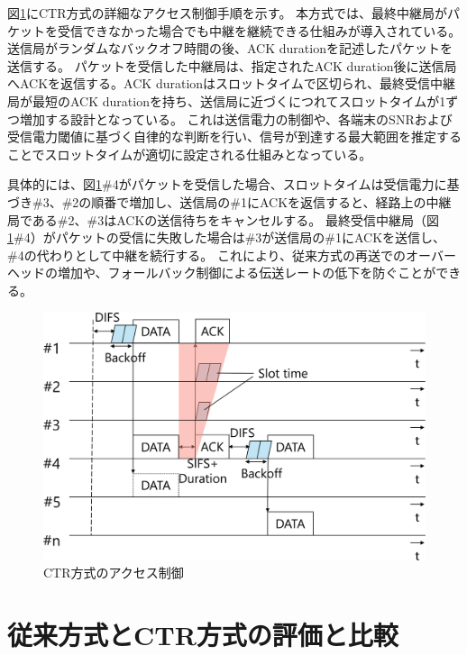 \documentclass[a4paper,10.5pt]{ltjsarticle}
\begin{document}
図\ref{fig:CTR_accsess}にCTR方式の詳細なアクセス制御手順を示す。
本方式では、最終中継局がパケットを受信できなかった場合でも中継を継続できる仕組みが導入されている。
送信局がランダムなバックオフ時間の後、ACK durationを記述したパケットを送信する。
パケットを受信した中継局は、指定されたACK duration後に送信局へACKを返信する。ACK durationはスロットタイムで区切られ、最終受信中継局が最短のACK durationを持ち、送信局に近づくにつれてスロットタイムが1ずつ増加する設計となっている。
これは送信電力の制御や、各端末のSNRおよび受信電力閾値に基づく自律的な判断を行い、信号が到達する最大範囲を推定することでスロットタイムが適切に設定される仕組みとなっている。

具体的には、図\ref{fig:CTR_accsess}\#4がパケットを受信した場合、スロットタイムは受信電力に基づき\#3、\#2の順番で増加し、送信局の\#1にACKを返信すると、経路上の中継局である\#2、\#3はACKの送信待ちをキャンセルする。
最終受信中継局（図\ref{fig:CTR_accsess}\#4）がパケットの受信に失敗した場合は\#3が送信局の\#1にACKを送信し、\#4の代わりとして中継を続行する。
これにより、従来方式の再送でのオーバーヘッドの増加や、フォールバック制御による伝送レートの低下を防ぐことができる。

\begin{figure}[H]
  \centering
  \includegraphics[width=\linewidth]{CTR_accsess.pdf} %
  \caption{CTR方式のアクセス制御}
  \label{fig:CTR_accsess} %
\end{figure}

\clearpage
\section{従来方式とCTR方式の評価と比較}
\end{document}
